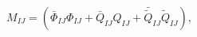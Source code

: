 \begin{equation}\label{mass}
M_{IJ}=
(\bar{\Phi}_{IJ}\Phi_{IJ}+\bar{Q}_{IJ}Q_{IJ}+\bar{\tilde{Q}}_{IJ}\tilde{Q}_{IJ}),
\end{equation}

